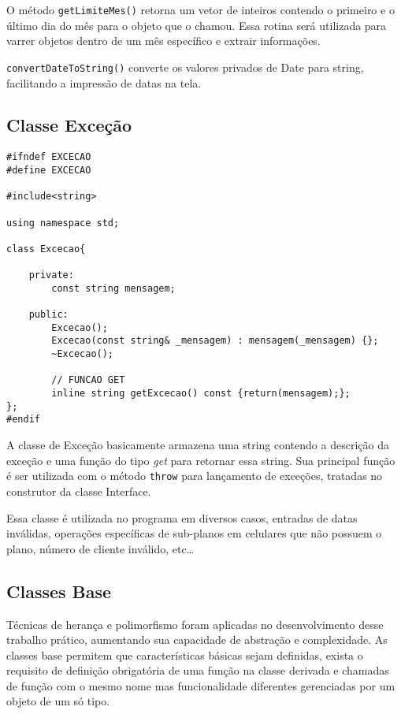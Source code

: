O método \texttt{getLimiteMes()} retorna um vetor de inteiros contendo o primeiro e o último dia do mês para o objeto que o chamou. Essa rotina será utilizada para varrer objetos dentro de um mês específico e extrair informações.

\texttt{convertDateToString()} converte os valores privados de Date para string, facilitando a impressão de datas na tela.

\subsection{Classe Exceção} \label{sec:excecao}

\begin{lstlisting}[basicstyle=\tiny]
#ifndef EXCECAO
#define EXCECAO

#include<string>

using namespace std;

class Excecao{

	private:
		const string mensagem;
	
	public:
		Excecao();
		Excecao(const string& _mensagem) : mensagem(_mensagem) {};
		~Excecao();
		
		// FUNCAO GET
		inline string getExcecao() const {return(mensagem);};
};
#endif
\end{lstlisting}

A classe de Exceção basicamente armazena uma string contendo a descrição da exceção e uma função do tipo \textit{get} para retornar essa string. Sua principal função é ser utilizada com o método \texttt{throw} para lançamento de exceções, tratadas no construtor da classe Interface.

Essa classe é utilizada no programa em diversos casos, entradas de datas inválidas, operações específicas de sub-planos em celulares que não possuem o plano, número de cliente inválido, etc\dots

\subsection{Classes Base} \label{sec:classes_base}

Técnicas de herança e polimorfismo foram aplicadas no desenvolvimento desse trabalho prático, aumentando sua capacidade de abstração e complexidade. As classes base permitem que  características básicas sejam definidas, exista o requisito de definição obrigatória de uma função na classe derivada e chamadas de função com o mesmo nome mas funcionalidade diferentes gerenciadas por um objeto de um só tipo. 

